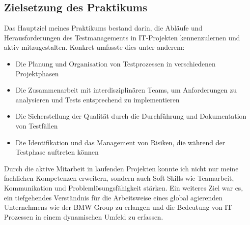 \subsection{Zielsetzung des Praktikums}
Das Hauptziel meines Praktikums bestand darin, die Abläufe und Herausforderungen des Testmanagements in IT-Projekten kennenzulernen und aktiv mitzugestalten. Konkret umfasste dies unter anderem:
\begin{itemize}
  \item Die Planung und Organisation von Testprozessen in verschiedenen Projektphasen
  \item Die Zusammenarbeit mit interdisziplinären Teams, um Anforderungen zu analysieren und Tests entsprechend zu implementieren
  \item Die Sicherstellung der Qualität durch die Durchführung und Dokumentation von Testfällen
  \item Die Identifikation und das Management von Risiken, die während der Testphase auftreten können
\end{itemize}
Durch die aktive Mitarbeit in laufenden Projekten konnte ich nicht nur meine fachlichen Kompetenzen erweitern, sondern auch Soft Skills wie Teamarbeit, Kommunikation und Problemlösungsfähigkeit stärken. 
Ein weiteres Ziel war es, ein tiefgehendes Verständnis für die Arbeitsweise eines global agierenden Unternehmens wie der BMW Group zu erlangen und die Bedeutung von IT-Prozessen in einem dynamischen Umfeld zu erfassen.
